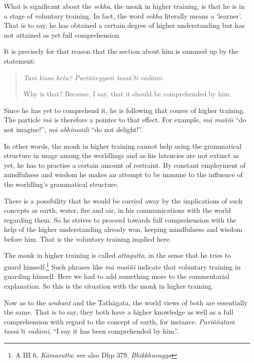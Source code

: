 What is significant about the \emph{sekha}, the monk in higher training, is that he is in a stage of voluntary training. In fact, the word \emph{sekha} literally means a `learner'. That is to say, he has obtained a certain degree of higher understanding but has not attained as yet full comprehension.

It is precisely for that reason that the section about him is summed up by the statement:

\enlargethispage{\baselineskip}

\begin{quote}
\emph{Taṁ kissa hetu? Pariññeyyaṁ tassā'ti vadāmi.}

Why is that? Because, I say, that it should be comprehended by him.
\end{quote}

Since he has yet to comprehend it, he is following that course of higher training. The particle \emph{mā} is therefore a pointer to that effect. For example, \emph{mā maññi} ``do not imagine!'', \emph{mā abhinandi} ``do not delight!''.

In other words, the monk in higher training cannot help using the grammatical structure in usage among the worldlings and as his latencies are not extinct as yet, he has to practise a certain amount of restraint. By constant employment of mindfulness and wisdom he makes an attempt to be immune to the influence of the worldling's grammatical structure.

There is a possibility that he would be carried away by the implications of such concepts as earth, water, fire and air, in his communications with the world regarding them. So he strives to proceed towards full comprehension with the help of the higher understanding already won, keeping mindfulness and wisdom before him. That is the voluntary training implied here.

The monk in higher training is called \emph{attagutto}, in the sense that he tries to guard himself.\footnote{A III 6, \emph{Kāmasutta}; see also Dhp 379, \emph{Bhikkhuvagga}} Such phrases like \emph{mā maññi} indicate that voluntary training in guarding himself. Here we had to add something more to the commentarial explanation. So this is the situation with the monk in higher training.

Now as to the \emph{arahant} and the Tathāgata, the world views of both are essentially the same. That is to say, they both have a higher knowledge as well as a full comprehension with regard to the concept of earth, for instance. \emph{Pariññātaṁ tassā'ti vadāmi}, ``I say it has been comprehended by him''.

